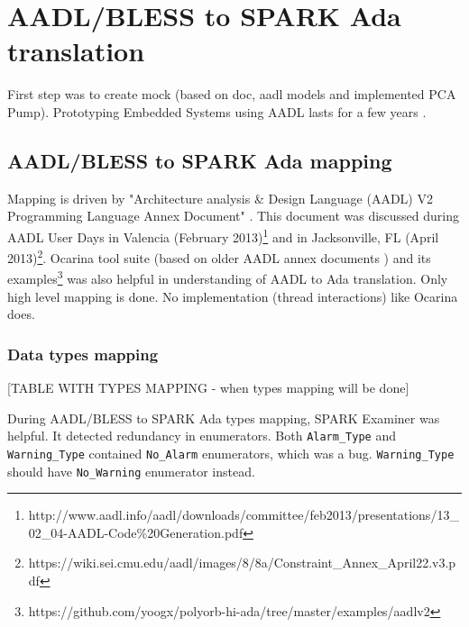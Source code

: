 
\cleardoublepage


\chapter{AADL/BLESS to SPARK Ada translation}
\label{codegen}

First step was to create mock (based on doc, aadl models and implemented PCA Pump).
Prototyping Embedded Systems using AADL lasts for a few years \cite{PrototypyingAadl:Paper}.



\section{AADL/BLESS to SPARK Ada mapping}
\label{codegen:mapping}



Mapping is driven by "Architecture analysis \& Design Language (AADL) V2 Programming Language Annex Document" \cite{AnnexDoc}. This document was discussed during AADL User Days in Valencia (February 2013)\footnote{http://www.aadl.info/aadl/downloads/committee/feb2013/presentations/13\_02\_04-AADL-Code\%20Generation.pdf} and in Jacksonville, FL (April 2013)\footnote{https://wiki.sei.cmu.edu/aadl/images/8/8a/Constraint\_Annex\_April22.v3.pdf}. Ocarina tool suite (based on older AADL annex documents \cite{Ocarina:Article}) and its examples\footnote{https://github.com/yoogx/polyorb-hi-ada/tree/master/examples/aadlv2} was also helpful in understanding of AADL to Ada translation.
Only high level mapping is done. No implementation (thread interactions) like Ocarina does. 


\subsection{Data types mapping}
\label{codegen:mapping:data}

[TABLE WITH TYPES MAPPING - when types mapping will be done]

During AADL/BLESS to SPARK Ada types mapping, SPARK Examiner was helpful. It detected redundancy in enumerators. Both \lstinline{Alarm_Type} and \lstinline{Warning_Type} contained \lstinline{No_Alarm} enumerators, which was a bug. \lstinline{Warning_Type} should have \lstinline{No_Warning} enumerator instead.


